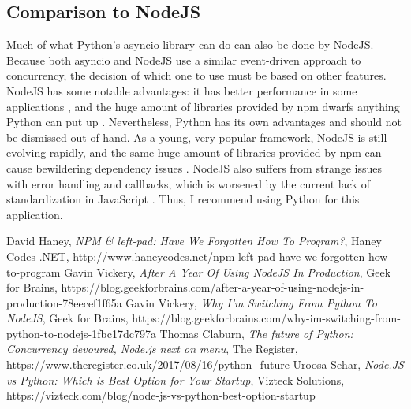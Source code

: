 \documentclass[letterpaper,twocolumn,10pt]{article}
\begin{document}
    \subsection{Comparison to NodeJS}
    Much of what Python's asyncio library can do can also be done by NodeJS. Because both asyncio and NodeJS use a similar event-driven approach to concurrency, the decision of which one to use must be based on other features. NodeJS has some notable advantages: it has better performance in some applications \cite{viz}, and the huge amount of libraries provided by npm dwarfs anything Python can put up \cite{gfb1}. Nevertheless, Python has its own advantages and should not be dismissed out of hand. As a young, very popular framework, NodeJS is still evolving rapidly, and the same huge amount of libraries provided by npm can cause bewildering dependency issues \cite{leftpad}. NodeJS also suffers from strange issues with error handling and callbacks, which is worsened by the current lack of standardization in JavaScript \cite{gfb2}. Thus, I recommend using Python for this application.
    
    \begin{thebibliography}{9}
    David Haney, 
    \textit{NPM \& left-pad: Have We Forgotten How To Program?},
    Haney Codes .NET,
    http://www.haneycodes.net/npm-left-pad-have-we-forgotten-how-to-program
    Gavin Vickery,
    \textit{After A Year Of Using NodeJS In Production},
    Geek for Brains,
    https://blog.geekforbrains.com/after-a-year-of-using-nodejs-in-production-78eecef1f65a
    Gavin Vickery,
    \textit{Why I'm Switching From Python To NodeJS},
    Geek for Brains,
    https://blog.geekforbrains.com/why-im-switching-from-python-to-nodejs-1fbc17dc797a
    Thomas Claburn,
    \textit{The future of Python: Concurrency devoured, Node.js next on menu},
    The Register, 
    https://www.theregister.co.uk/2017/08/16/python\_future
    Uroosa Sehar,
    \textit{Node.JS vs Python: Which is Best Option for Your Startup},
    Vizteck Solutions,
    https://vizteck.com/blog/node-js-vs-python-best-option-startup
    \end{thebibliography}
    
\end{document}
